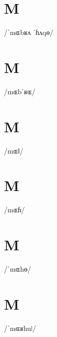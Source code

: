 \documentclass[10pt,a4paper,twoside]{book}
\begin{document}
\section*{M}

\begin{multicols}{3}
 {/ˈmɶbʁʌ ˈɦʌqɵ/} {}
\end{multicols}

\section*{M}

\begin{multicols}{3}
 {/mɶbˈʁɶ/} {}
\end{multicols}

\section*{M}

\begin{multicols}{3}
 {/mɶǁ/} {}
\end{multicols}

\section*{M}

\begin{multicols}{3}
 {/mɶɦ/} {}
\end{multicols}

\section*{M}

\begin{multicols}{3}
 {/ˈmɶhɵ/} {}
\end{multicols}

\section*{M}

\begin{multicols}{3}
 {/ˈmɶʁhuǀ/} {}
\end{multicols}
\end{document}
